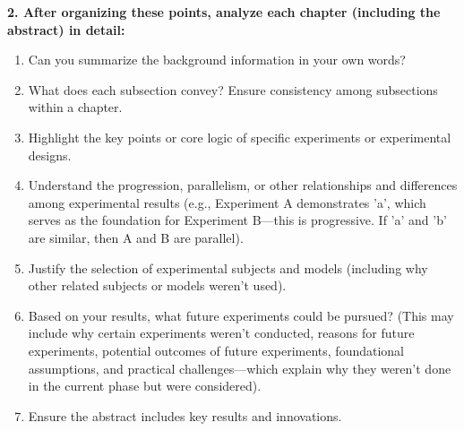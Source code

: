 \textbf{2. After organizing these points, analyze each chapter (including the abstract) in detail:}
\begin{enumerate}
    \item Can you summarize the background information in your own words?
    \item What does each subsection convey? Ensure consistency among subsections within a chapter.
    \item Highlight the key points or core logic of specific experiments or experimental designs.
    \item Understand the progression, parallelism, or other relationships and differences among experimental results (e.g., Experiment A demonstrates 'a', which serves as the foundation for Experiment B—this is progressive. If 'a' and 'b' are similar, then A and B are parallel).
    \item Justify the selection of experimental subjects and models (including why other related subjects or models weren't used).
    \item Based on your results, what future experiments could be pursued? (This may include why certain experiments weren't conducted, reasons for future experiments, potential outcomes of future experiments, foundational assumptions, and practical challenges—which explain why they weren't done in the current phase but were considered).
    \item Ensure the abstract includes key results and innovations.
\end{enumerate}

